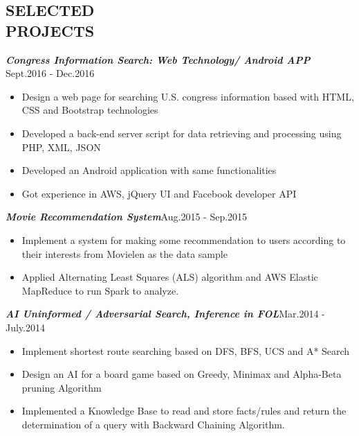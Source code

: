 \documentclass[margin,line]{res}
\begin{document}
\begin{resume}
\section{SELECTED \\ PROJECTS}
           {\sl \textbf{Congress Information Search: Web Technology/ Android APP}}           \hfill Sept.2016 - Dec.2016 \\[1mm]
             \vspace{-5mm}
             \begin{itemize}
	\item Design a web page for searching U.S. congress information based with HTML, CSS and Bootstrap technologies
		\item Developed a back-end server script for data retrieving and processing using PHP, XML, JSON
		\item Developed an Android application with same functionalities
		\item Got experience in AWS, jQuery UI and Facebook developer API
             \end{itemize}
             \vspace{-3mm}
            {\sl \textbf{Movie Recommendation System}}\hfill Aug.2015 - Sep.2015 \\[1mm]
            \vspace{-5mm}
             \begin{itemize}
	\item Implement a system for making some recommendation to users according to their interests from Movielen as the data sample
	\item Applied Alternating Least Squares (ALS) algorithm and AWS Elastic MapReduce to run Spark to analyze. 
	  \end{itemize}
             \vspace{-3mm}
            {\sl \textbf{AI Uninformed / Adversarial Search, Inference in FOL}}\hfill Mar.2014 - July.2014 \\[1mm]
            \vspace{-5mm}
            \begin{itemize}
	\item Implement shortest route searching based on DFS, BFS, UCS and A* Search
	\item Design an AI for a board game based on Greedy, Minimax and Alpha-Beta pruning Algorithm
	\item Implemented a Knowledge Base to read and store facts/rules and return the determination of a query with Backward Chaining Algorithm.


\end{itemize}
\end{resume}
\end{document}
